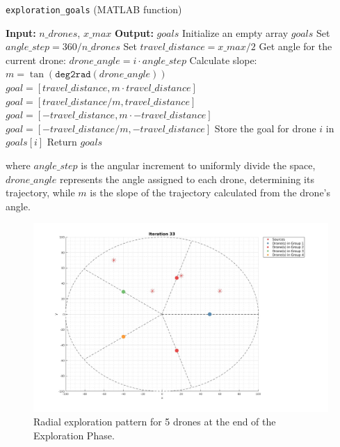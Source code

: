 \begin{algorithm}[H]
    \caption{\texttt{exploration\_goals} (MATLAB function)} \label{alg:exploration_goals}
    \begin{algorithmic}[1]
        \State \textbf{Input:} $n\_{drones}$, $x\_{max}$
        \State \textbf{Output:} $goals$ 
        \State Initialize an empty array $goals$
        \State Set $angle\_step = 360 / n\_{drones}$
        \State Set $travel\_distance = x\_{max} / 2$ 
            \State Get angle for the current drone: $drone\_angle = i \cdot angle\_step$
            \State Calculate slope: $m = \tan(\texttt{deg2rad}(drone\_angle))$
                \State $goal = [travel\_distance, m \cdot travel\_distance]$ 
                \State $goal = [travel\_distance / m, travel\_distance]$ 
                \State $goal = [-travel\_distance, m \cdot -travel\_distance]$ 
                \State $goal = [-travel\_distance / m, -travel\_distance]$ 
            \EndIf
            \State Store the goal for drone $i$ in $goals[i]$
        \EndFor
        \State Return $goals$
    \end{algorithmic}
\end{algorithm}

where $angle\_step$ is the angular increment to uniformly divide the space, $drone\_angle$ represents the angle assigned to each drone, determining its trajectory, 
while $m$ is the slope of the trajectory calculated from the drone's angle. 

\begin{figure}
    \centering
    \includegraphics[width=\textwidth]{images/exploration_pattern.jpg} 
    \caption{Radial exploration pattern for 5 drones at the end of the Exploration Phase.}
    \label{fig:exploration_pattern}
\end{figure}

